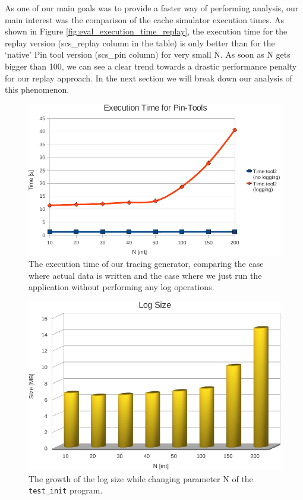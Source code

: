 As one of our main goals was to provide a faster way of performing analysis,
our main interest was the comparison of the cache simulator execution
times. As shown in Figure \ref{fig:eval_execution_time_replay}, the
execution time for the replay version (scs\_replay column in the table) is only better 
than for the `native' Pin tool version (scs\_pin column) for very small N.
As soon as N gets bigger than
100, we can see a clear trend towards a drastic performance penalty
for our replay approach. In the next section we will break down our
analysis of this phenomenon.

\begin{figure}
  \includegraphics[width=\columnwidth]{eval_execution_time_tracing}
  \caption{The execution time of our tracing generator, comparing the
    case where actual data is written and the case where we just run
    the application without performing any log operations.}
  \label{fig:eval_execution_time_tracing}
\end{figure}

\begin{figure}
  \includegraphics[width=\columnwidth]{eval_log_size}
  \caption{The growth of the log size while changing parameter N of the \texttt{test\_init} program. }
  \label{fig:eval_log_size}
\end{figure}


